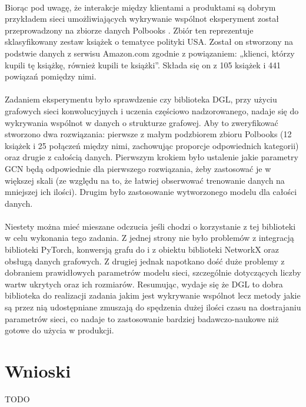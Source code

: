 \documentclass{article}
\begin{document}
\paragraph{}
Biorąc pod uwagę, że interakcje między klientami a produktami są dobrym przykładem sieci umożliwiających wykrywanie wspólnot eksperyment został przeprowadzony na zbiorze danych Polbooks \cite{polbooks}. Zbiór ten reprezentuje sklasyfikowany zestaw książek o tematyce polityki USA. Został on stworzony na podstwie danych z serwisu Amazon.com zgodnie z powiązaniem: „klienci, którzy kupili tę książkę, również kupili te książki”. Składa się on z 105 książek i 441 powiązań pomiędzy nimi. 

\paragraph{}
Zadaniem eksperymentu było sprawdzenie czy biblioteka DGL, przy użyciu grafowych sieci konwolucyjnych i uczenia częściowo nadzorowanego, nadaje się do wykrywania wspólnot w danych o strukturze grafowej. Aby to zweryfikować stworzono dwa rozwiązania: pierwsze z małym podzbiorem zbioru Polbooks (12 książek i 25 połączeń między nimi, zachowując proporcje odpowiednich kategorii) oraz drugie z całością danych. Pierwszym krokiem było ustalenie jakie parametry GCN będą odpowiednie dla pierwszego rozwiązania, żeby zastosować je w większej skali (ze względu na to, że łatwiej obserwować trenowanie danych na mniejszej ich ilości). Drugim było zastosowanie wytworzonego modelu dla całości danych.


\paragraph{}
Niestety można mieć mieszane odczucia jeśli chodzi o korzystanie z tej biblioteki w celu wykonania tego zadania.
Z jednej strony nie było problemów z integracją biblioteki PyTorch, konwersją grafu do i z obiektu biblioteki NetworkX oraz obsługą danych grafowych. Z drugiej jednak napotkano dość duże problemy z dobraniem prawidłowych parametrów modelu sieci, szczególnie dotyczących liczby wartw ukrytych oraz ich rozmiarów. Resumując, wydaje się że DGL to dobra biblioteka do realizacji zadania jakim jest wykrywanie wspólnot lecz metody jakie są przez nią udostępniane zmuszają do spędzenia dużej ilości czasu na dostrajaniu parametrów sieci, co nadaje to zastosowanie bardziej badawczo-naukowe niż gotowe do użycia w produkcji.

\section{Wnioski}
\label{sec:conclusions}
TODO
\end{document}
